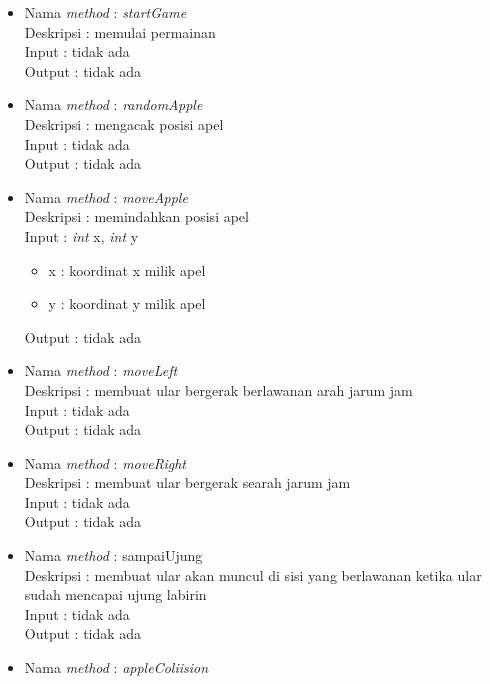 \begin{enumerate}
		\begin{itemize}
			\item Nama \textit{method} : \textit{startGame}\\
				  Deskripsi : memulai permainan\\
				  Input : tidak ada\\
				  Output : tidak ada\\
			\item Nama \textit{method} : \textit{randomApple}\\
				  Deskripsi : mengacak posisi apel\\
				  Input : tidak ada\\
				  Output : tidak ada\\
			\item Nama \textit{method} : \textit{moveApple}\\
				  Deskripsi : memindahkan posisi apel\\
				  Input : \textit{int} x, \textit{int} y
				  	\begin{itemize}
				  		\item x : koordinat x milik apel
				  		\item y : koordinat y milik apel
				  	\end{itemize}
				  Output : tidak ada\\
			\item Nama \textit{method} : \textit{moveLeft}\\
				  Deskripsi : membuat ular bergerak berlawanan arah jarum jam\\
				  Input : tidak ada\\
				  Output : tidak ada\\
			\item Nama \textit{method} : \textit{moveRight}\\
				  Deskripsi : membuat ular bergerak searah jarum jam\\
				  Input : tidak ada\\
				  Output : tidak ada\\
			\item Nama \textit{method} : sampaiUjung\\
				  Deskripsi : membuat ular akan muncul di sisi yang berlawanan ketika ular sudah mencapai ujung labirin\\
				  Input : tidak ada\\
				  Output : tidak ada\\
			\item Nama \textit{method} : \textit{appleColiision}\\

\end{itemize}
\end{enumerate}
